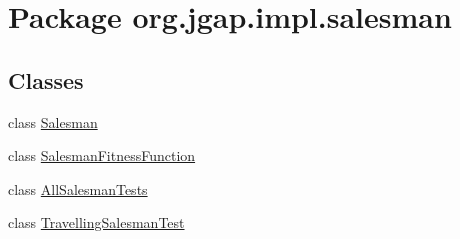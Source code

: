 \hypertarget{namespaceorg_1_1jgap_1_1impl_1_1salesman}{\section{Package org.\-jgap.\-impl.\-salesman}
\label{namespaceorg_1_1jgap_1_1impl_1_1salesman}
}
\subsection*{Classes}
\begin{DoxyCompactItemize}
\item 
class \hyperlink{classorg_1_1jgap_1_1impl_1_1salesman_1_1_salesman}{Salesman}
\item 
class \hyperlink{classorg_1_1jgap_1_1impl_1_1salesman_1_1_salesman_fitness_function}{Salesman\-Fitness\-Function}
\item 
class \hyperlink{classorg_1_1jgap_1_1impl_1_1salesman_1_1_all_salesman_tests}{All\-Salesman\-Tests}
\item 
class \hyperlink{classorg_1_1jgap_1_1impl_1_1salesman_1_1_travelling_salesman_test}{Travelling\-Salesman\-Test}
\end{DoxyCompactItemize}
